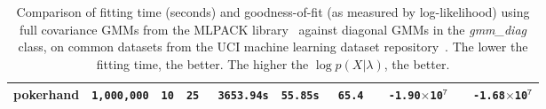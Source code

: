 \begin{table}[!tb]
\begin{tabular}{|l|c|c|c|c|c|c|c|c|}
  pokerhand   & {\tt 1,000,000} & {\tt 10} & {\tt 25} & {\tt ~3653.94s} &  {\tt\bfseries 55.85s} & {\tt ~65.4} & {\tt~~-1.90{\tiny$\times$}10$^{\mathtt 7}$} & {\tt\bfseries ~~-1.68{\tiny$\times$}10$^{\mathtt 7}$} \\
\hline
\end{tabular}
\vspace{1ex}
\caption
  {
  Comparison of fitting time (seconds) and goodness-of-fit (as measured by log-likelihood) using full covariance GMMs from the MLPACK library~\cite{Curtin_2013}
  against diagonal GMMs in the {\it gmm\_diag} class,
  on common datasets from the UCI machine learning dataset repository~\cite{Lichman_2013}.
  The lower the fitting time, the better.
  The higher the $\log p(X|\lambda)$, the better.
  }
\label{tab:results}
\end{table}



% 

